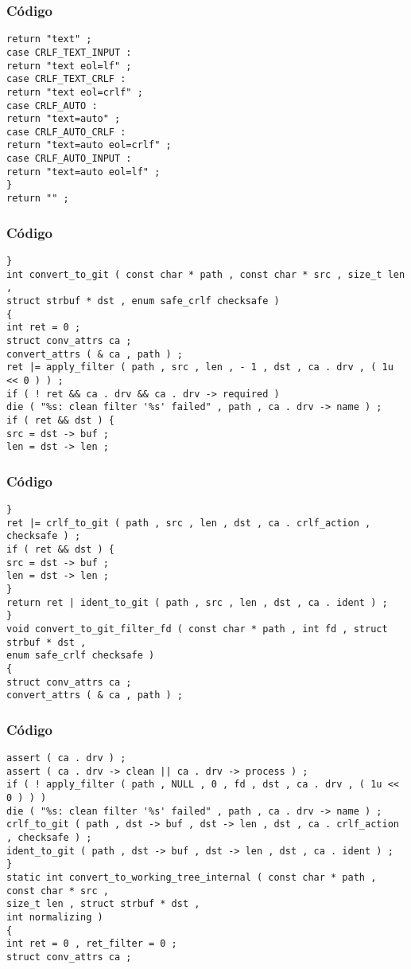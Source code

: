 \documentclass{beamer}
\begin{document}
\begin{frame}[fragile]
\frametitle{C\'odigo}
\begin{verbatim}
return "text" ; 
case CRLF_TEXT_INPUT : 
return "text eol=lf" ; 
case CRLF_TEXT_CRLF : 
return "text eol=crlf" ; 
case CRLF_AUTO : 
return "text=auto" ; 
case CRLF_AUTO_CRLF : 
return "text=auto eol=crlf" ; 
case CRLF_AUTO_INPUT : 
return "text=auto eol=lf" ; 
} 
return "" ; 
\end{verbatim}
\end{frame}
\begin{frame}[fragile]
\frametitle{C\'odigo}
\begin{verbatim}
} 
int convert_to_git ( const char * path , const char * src , size_t len , 
struct strbuf * dst , enum safe_crlf checksafe ) 
{ 
int ret = 0 ; 
struct conv_attrs ca ; 
convert_attrs ( & ca , path ) ; 
ret |= apply_filter ( path , src , len , - 1 , dst , ca . drv , ( 1u << 0 ) ) ; 
if ( ! ret && ca . drv && ca . drv -> required ) 
die ( "%s: clean filter '%s' failed" , path , ca . drv -> name ) ; 
if ( ret && dst ) { 
src = dst -> buf ; 
len = dst -> len ; 
\end{verbatim}
\end{frame}
\begin{frame}[fragile]
\frametitle{C\'odigo}
\begin{verbatim}
} 
ret |= crlf_to_git ( path , src , len , dst , ca . crlf_action , checksafe ) ; 
if ( ret && dst ) { 
src = dst -> buf ; 
len = dst -> len ; 
} 
return ret | ident_to_git ( path , src , len , dst , ca . ident ) ; 
} 
void convert_to_git_filter_fd ( const char * path , int fd , struct strbuf * dst , 
enum safe_crlf checksafe ) 
{ 
struct conv_attrs ca ; 
convert_attrs ( & ca , path ) ; 
\end{verbatim}
\end{frame}
\begin{frame}[fragile]
\frametitle{C\'odigo}
\begin{verbatim}
assert ( ca . drv ) ; 
assert ( ca . drv -> clean || ca . drv -> process ) ; 
if ( ! apply_filter ( path , NULL , 0 , fd , dst , ca . drv , ( 1u << 0 ) ) ) 
die ( "%s: clean filter '%s' failed" , path , ca . drv -> name ) ; 
crlf_to_git ( path , dst -> buf , dst -> len , dst , ca . crlf_action , checksafe ) ; 
ident_to_git ( path , dst -> buf , dst -> len , dst , ca . ident ) ; 
} 
static int convert_to_working_tree_internal ( const char * path , const char * src , 
size_t len , struct strbuf * dst , 
int normalizing ) 
{ 
int ret = 0 , ret_filter = 0 ; 
struct conv_attrs ca ; 
\end{verbatim}
\end{frame}
\end{document}
